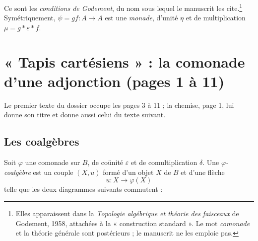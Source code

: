 \documentclass[11pt,a4paper]{article}
\begin{document}


Ce sont les \emph{conditions de Godement}, du nom sous lequel le manuscrit les
cite.\footnote{Elles apparaissent dans la \emph{Topologie algébrique et théorie
des faisceaux} de Godement, 1958, attachées à la « construction standard ». Le
mot \emph{comonade} et la théorie générale sont postérieurs ; le manuscrit ne
les emploie pas.} Symétriquement, $\psi = gf : A \to A$ est une \emph{monade},
d'unité $\eta$ et de multiplication $\mu = g * \varepsilon * f$.

\section*{« Tapis cartésiens » : la comonade d'une adjonction (pages 1 à 11)}

Le premier texte du dossier occupe les pages 3 à 11 ; la chemise, page 1, lui
donne son titre et donne aussi celui du texte suivant.

\subsection*{Les coalgèbres}

Soit $\varphi$ une comonade sur $B$, de coünité $\varepsilon$ et de
comultiplication $\delta$. Une \emph{$\varphi$-coalgèbre} est un couple
$(X, u)$ formé d'un objet $X$ de $B$ et d'une flèche
\[
  u : X \longrightarrow \varphi(X)
\]
telle que les deux diagrammes suivants commutent :


\end{document}
